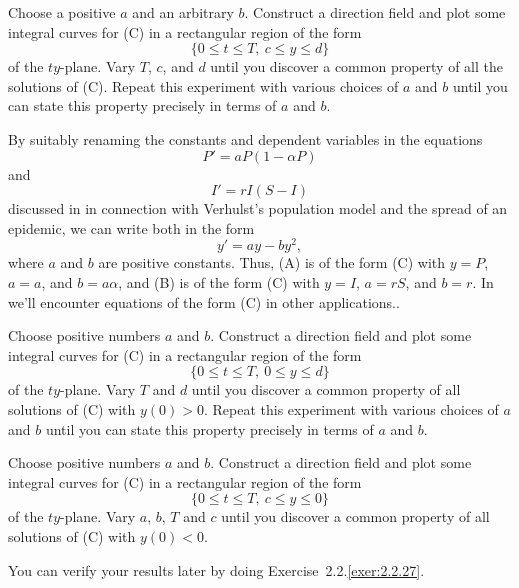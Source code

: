 \begin{exerciselist}
Choose a positive  $a$  and an
arbitrary  $b$.
 Construct a  direction field and plot some integral curves for (C) in
a rectangular
region of the form
\[
\{0\le t\le T,\ c\le y\le d\}
\]
 of the $ty$-plane.
 Vary $T$, $c$, and $d$ until you discover a common property
of all the solutions of (C). Repeat this experiment with various
choices of $a$ and $b$ until you can state
this property precisely in terms of $a$ and $b$.

\item\label{exer:1.3.24}\Lex
By suitably renaming the constants and  dependent variables
in the equations
\[
P'=aP(1-\alpha P)\tag{A}
\]
and
\[
I'=rI(S-I)\tag{B}
\]
discussed in  in connection with Verhulst's
population model
and the spread of an epidemic, we can write both in the form
\[
y'=ay-by^2,\tag{C}
\]
where $a$ and $b$ are positive constants. Thus, (A) is of the form (C)
with $y=P$, $a=a$, and $b=a\alpha$, and (B) is of the form (C) with
$y=I$, $a=rS$, and $b=r$. In  we'll encounter
equations of the form
(C) in
 other applications..

\begin{alist}
\item %
Choose positive numbers $a$ and $b$. Construct a direction field and
plot some integral curves for (C) in a rectangular region of the form
\[
\{0\le t\le T,\ 0\le y\le d\}
\]
of the $ty$-plane. Vary $T$ and $d$ until you discover a common
property of all solutions of (C) with $y(0)>0$. Repeat this experiment
with various choices of $a$ and $b$ until you can state this property
precisely in terms of $a$ and $b$.

\item %
Choose  positive numbers $a$ and $b$. Construct a direction field and
plot some integral curves for (C) in a rectangular region of the form
\[
\{0\le t\le T,\ c\le y\le 0\}
\]
of the $ty$-plane. Vary $a$, $b$, $T$ and $c$ until you discover a
common property of all solutions of (C) with $y(0)<0$.

You can verify your results later by doing {Exercise~2.2.\ref{exer:2.2.27}}.

\end{alist}
\end{exerciselist}
